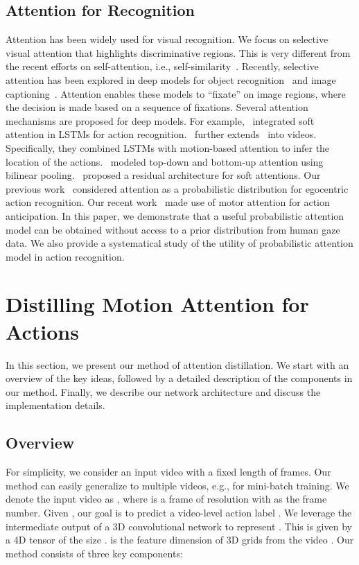 \documentclass{bmvc2k}
\begin{document}
\subsection{Attention for Recognition} 
Attention has been widely used for visual recognition. We focus on selective visual attention that highlights discriminative regions. This is very different from the recent efforts on self-attention, i.e., self-similarity~\cite{vaswani2017attention,Girdhar_2019_CVPR,zhang2018self}. Recently, selective attention has been explored in deep models for object recognition~\cite{mnih2014recurrent} and image captioning~\cite{xu2015show}. Attention enables these models to ``fixate'' on image regions, where the decision is made based on a sequence of fixations. Several attention mechanisms are proposed for deep models. For example,~\cite{sharma2015action} integrated soft attention in LSTMs for action recognition.~\cite{li2018videolstm} further extends~\cite{xu2015show} into videos. Specifically, they combined LSTMs with motion-based attention to infer the location of the actions.~\cite{Girdhar_17b_AttentionalPoolingAction} modeled top-down and bottom-up attention using bilinear pooling.~\cite{wang2017residual} proposed a residual architecture for soft attentions. Our previous work~\cite{Li_2018_ECCV, li2020eye} considered attention as a probabilistic distribution for egocentric action recognition. Our recent work~\cite{liu2019forecasting} made use of motor attention for action anticipation. In this paper, we demonstrate that a useful probabilistic attention model can be obtained without access to a prior distribution from human gaze data. We also provide a systematical study of the utility of probabilistic attention model in action recognition. 

\section{Distilling Motion Attention for Actions}

In this section, we present our method of attention distillation. We start with an overview of the key ideas, followed by a detailed description of the components in our method. Finally, we describe our network architecture and discuss the implementation details.

\subsection{Overview}
For simplicity, we consider an input video with a fixed length of  frames. Our method can easily generalize to multiple videos, e.g., for mini-batch training. We denote the input video as , where  is a frame of resolution  with  as the frame number. Given , our goal is to predict a video-level action label . We leverage the intermediate output of a 3D convolutional network  to represent . This is given by a 4D tensor  of the size .  is the feature dimension of 3D grids  from the video . Our method consists of three key components:
\end{document}

